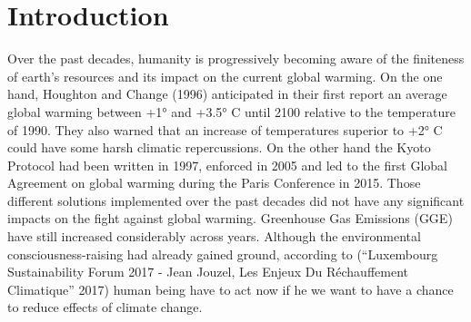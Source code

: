 \documentclass[12pt,]{article}
\begin{document}
\listoftables

\newpage


\listoffigures

\newpage


\section*{Introduction}\label{introduction}

Over the past decades, humanity is progressively becoming aware of the
finiteness of earth's resources and its impact on the current global
warming. On the one hand, Houghton and Change (1996) anticipated in
their first report an average global warming between +1° and +3.5° C
until 2100 relative to the temperature of 1990. They also warned that an
increase of temperatures superior to +2° C could have some harsh
climatic repercussions. On the other hand the Kyoto Protocol had been
written in 1997, enforced in 2005 and led to the first Global Agreement
on global warming during the Paris Conference in 2015. Those different
solutions implemented over the past decades did not have any significant
impacts on the fight against global warming. Greenhouse Gas Emissions
(GGE) have still increased considerably across years. Although the
environmental consciousness-raising had already gained ground, according
to (``Luxembourg Sustainability Forum 2017 - Jean Jouzel, Les Enjeux Du
Réchauffement Climatique'' 2017) human being have to act now if he we
want to have a chance to reduce effects of climate change.
\end{document}
